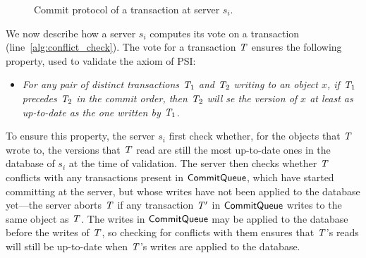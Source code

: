 \begin{figure}[h]
\begin{algorithm}[H]
  \smallskip


  \smallskip

\end{algorithm}
\caption{Commit protocol of a transaction at server $s_i$. }
\end{figure}

We now describe how a server $s_i$ computes its vote on a transaction (line~\ref{alg:conflict_check}). The vote for a transaction $\mathit{T}$ ensures the following property, used to validate the \Wconflict axiom of PSI: 

\begin{itemize}
    \item \emph{For any pair of distinct transactions $\mathit{T}_1$ and $\mathit{T}_2$ writing to an object $x$, if $\mathit{T}_1$ precedes $\mathit{T}_2$ in the commit order, then $\mathit{T}_2$ will se the version of $x$ at least as up-to-date as the one written by $\mathit{T}_1$.}
\end{itemize}

To ensure this property, the server $s_i$ first check whether, for the objects that $\mathit{T}$ wrote to, the versions that $\mathit{T}$ read are still the most up-to-date ones in the database of $s_i$ at the time of validation. The server then checks whether $\mathit{T}$ conflicts with any transactions present in $\mathsf{CommitQueue}$, which have started committing at the server, but whose writes have not been applied to the database yet---the server aborts $\mathit{T}$ if any transaction $\mathit{T}'$ in $\mathsf{CommitQueue}$ writes to the same object as $\mathit{T}$. The writes in $\mathsf{CommitQueue}$ may be applied to the database before the writes of $\mathit{T}$, so checking for conflicts with them ensures that $\mathit{T}$'s reads will still be up-to-date when $\mathit{T}$'s writes are applied to the database.

